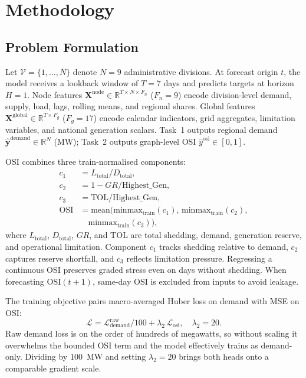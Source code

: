 \section{Methodology}\label{sec:methodology}

\subsection{Problem Formulation}

Let $\mathcal{V} = \{1, \ldots, N\}$ denote $N{=}9$ administrative divisions. At forecast origin $t$, the model receives a lookback window of $T{=}7$ days and predicts targets at horizon $H{=}1$. Node features $\mathbf{X}^{\mathrm{node}} \in \mathbb{R}^{T \times N \times F_n}$ ($F_n{=}9$) encode division-level demand, supply, load, lags, rolling means, and regional shares. Global features $\mathbf{X}^{\mathrm{global}} \in \mathbb{R}^{T \times F_g}$ ($F_g{=}17$) encode calendar indicators, grid aggregates, limitation variables, and national generation scalars. Task~1 outputs regional demand $\hat{\mathbf{y}}^{\mathrm{demand}} \in \mathbb{R}^N$ (MW); Task~2 outputs graph-level OSI $\hat{y}^{\mathrm{osi}} \in [0,1]$.

OSI combines three train-normalised components:
\begin{align}
c_1 &= L_{\mathrm{total}}/D_{\mathrm{total}}, \nonumber\\
c_2 &= 1 - GR/\mathrm{Highest\_Gen}, \nonumber\\
c_3 &= \mathrm{TOL}/\mathrm{Highest\_Gen}, \nonumber\\
\mathrm{OSI} &= \mathrm{mean}\bigl(\mathrm{minmax}_{\mathrm{train}}(c_1),\,
\mathrm{minmax}_{\mathrm{train}}(c_2), \nonumber\\
&\quad \mathrm{minmax}_{\mathrm{train}}(c_3)\bigr),
\end{align}
where $L_{\mathrm{total}}$, $D_{\mathrm{total}}$, $GR$, and $\mathrm{TOL}$ are total shedding, demand, generation reserve, and operational limitation. Component $c_1$ tracks shedding relative to demand, $c_2$ captures reserve shortfall, and $c_3$ reflects limitation pressure. Regressing a continuous OSI preserves graded stress even on days without shedding. When forecasting $\mathrm{OSI}(t{+}1)$, same-day OSI is excluded from inputs to avoid leakage.

The training objective pairs macro-averaged Huber loss on demand \cite{Huber1964RobustEstimation} with MSE on OSI:
\begin{equation}
\mathcal{L} = \mathcal{L}_{\mathrm{demand}}^{\mathrm{raw}}/100 + \lambda_2 \, \mathcal{L}_{\mathrm{osi}}, \quad \lambda_2 = 20.
\label{eq:loss}
\end{equation}
Raw demand loss is on the order of hundreds of megawatts, so without scaling it overwhelms the bounded OSI term and the model effectively trains as demand-only. Dividing by 100~MW and setting $\lambda_2{=}20$ brings both heads onto a comparable gradient scale.

